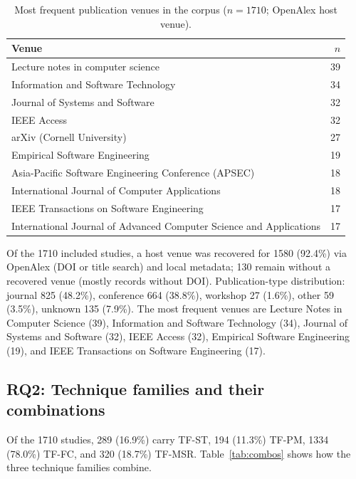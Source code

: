 \documentclass[preprint,12pt,authoryear=false]{elsarticle}
\newcommand{\PM}{TF-PM}
\newcommand{\ST}{TF-ST}
\newcommand{\FC}{TF-FC}
\newcommand{\MSR}{TF-MSR}
\begin{document}
\begin{table}[t]
\centering\small
\caption{Most frequent publication venues in the corpus ($n = 1710$; OpenAlex host venue).}
\label{tab:venues}
\begin{tabular}{lr}
\toprule
Venue & $n$ \\
\midrule
Lecture notes in computer science & 39 \\
Information and Software Technology & 34 \\
Journal of Systems and Software & 32 \\
IEEE Access & 32 \\
arXiv (Cornell University) & 27 \\
Empirical Software Engineering & 19 \\
Asia-Pacific Software Engineering Conference (APSEC) & 18 \\
International Journal of Computer Applications & 18 \\
IEEE Transactions on Software Engineering & 17 \\
International Journal of Advanced Computer Science and Applications & 17 \\
\bottomrule
\end{tabular}
\end{table}

Of the 1710 included studies, a host venue was recovered for 1580 (92.4\%) via OpenAlex (DOI or title search) and local metadata; 130 remain without a recovered venue (mostly records without DOI). Publication-type distribution: journal 825 (48.2\%), conference 664 (38.8\%), workshop 27 (1.6\%), other 59 (3.5\%), unknown 135 (7.9\%). The most frequent venues are Lecture Notes in Computer Science (39), Information and Software Technology (34), Journal of Systems and Software (32), IEEE Access (32), Empirical Software Engineering (19), and IEEE Transactions on Software Engineering (17).

\subsection{RQ2: Technique families and their combinations}\label{sec:rq2}

Of the 1710 studies, 289 (16.9\%) carry \ST{}, 194 (11.3\%) \PM{}, 1334 (78.0\%) \FC{}, and 320 (18.7\%) \MSR{}. Table~\ref{tab:combos} shows how the three technique families combine.
\end{document}
